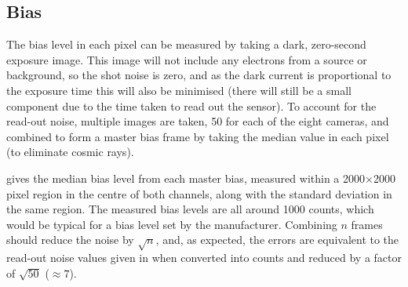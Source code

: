 
\subsection{Bias}
\label{sec:bias}
\begin{colsection}

The bias level in each pixel can be measured by taking a dark, zero-second exposure image. This image will not include any electrons from a source or background, so the shot noise is zero, and as the dark current is proportional to the exposure time this will also be minimised (there will still be a small component due to the time taken to read out the sensor). To account for the read-out noise, multiple images are taken, 50 for each of the eight cameras, and combined to form a master bias frame by taking the median value in each pixel (to eliminate cosmic rays).

 gives the median bias level from each master bias, measured within a 2000$\times$2000 pixel region in the centre of both channels, along with the standard deviation in the same region. The measured bias levels are all around 1000 counts, which would be typical for a bias level set by the manufacturer. Combining $n$ frames should reduce the noise by $\sqrt{n}$, and, as expected, the errors are equivalent to the read-out noise values given in  when converted into counts and reduced by a factor of $\sqrt{50}$ ($\approx 7$).


\end{colsection}
